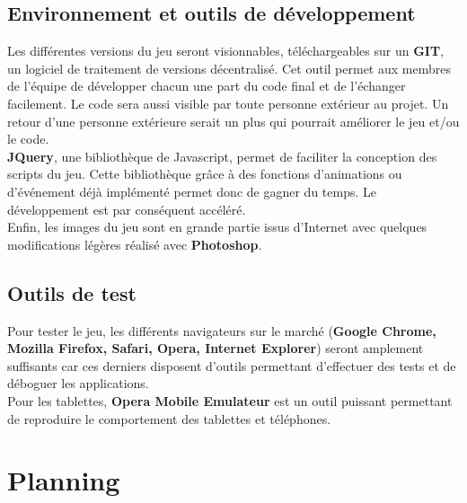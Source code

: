 \documentclass{article}
\begin{document}
\subsection{Environnement et outils de développement}

\hspace*{0.6cm}Les différentes versions du jeu seront visionnables, téléchargeables sur un \textbf{GIT}, un logiciel de traitement de versions décentralisé. Cet outil permet aux membres de l'équipe de développer chacun une part du code final et de l'échanger facilement. Le code sera aussi visible par toute personne extérieur au projet. Un retour d'une personne extérieure serait un plus qui pourrait améliorer le jeu et/ou le code.
\vspace{0.5cm}\\
\hspace*{0.6cm}\textbf{JQuery}, une bibliothèque de Javascript, permet de faciliter la conception des scripts du jeu. Cette bibliothèque gr\^ace à des fonctions d'animations ou d'événement déjà implémenté permet donc de gagner du temps. Le développement est par conséquent accéléré.
\vspace{0.5cm}\\
\hspace*{0.6cm}Enfin, les images du jeu sont en grande partie issus d'Internet avec quelques modifications légères réalisé avec \textbf{Photoshop}. 

\subsection{Outils de test}
\hspace*{0.6cm}Pour tester le jeu, les différents navigateurs sur le marché (\textbf{Google Chrome, Mozilla Firefox, Safari, Opera, Internet Explorer}) seront amplement suffisants car ces derniers disposent d'outils permettant d'effectuer des tests et de déboguer les applications.\\
\hspace*{0.6cm}Pour les tablettes, \textbf{Opera Mobile Emulateur} est un outil puissant permettant de reproduire le comportement des tablettes et téléphones.\\

\section{Planning}
\end{document}
